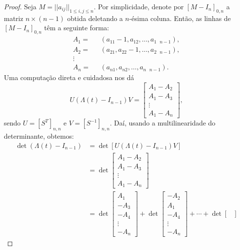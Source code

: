 	\begin{proof}
		Seja $M = ||a_{ij}||_{1\leq i,j\leq n}$. Por simplicidade, denote por $[M - I_n]_{0,n}$ 
		a matriz $n\times(n-1)$ obtida deletando a $n$-ésima coluna. Então, as linhas de 
		$[M - I_n]_{0,n}$ têm a seguinte forma:
		\begin{align*}
    		A_1 =& \text{ }(a_{11} - 1, a_{12}, \dots, a_{1\text{ }n-1}), \\
    		A_2 =& \text{ }(a_{21}, a_{22} - 1, \dots, a_{2\text{ }n-1}), \\
    		\vdots& \\
    		A_n =& \text{ }(a_{n1}, a_{n2}, \dots, a_{n\text{ }n-1}).
		\end{align*}
		Uma computação direta e cuidadosa nos dá
		\begin{equation*}
    		U(\Lambda(t) - I_{n-1})V = \begin{bmatrix}
    		A_1 - A_2 \\
    		A_1 - A_3 \\
    		\vdots \\
    		A_1 - A_n
    		\end{bmatrix},
		\end{equation*}
		sendo $U = [S^T]_{n,n}$ e $V = [S^{-1}]_{n,n}$. Daí, usando a multilinearidade 
		do determinante, obtemos:
		\begin{align*}
    		\det(\Lambda(t) - I_{n-1}) 
    		&=\det[U(\Lambda(t) - I_{n-1})V] 
    		\\
    		&= \det\begin{bmatrix}
    		A_1 - A_2\\
    		A_1 - A_3 \\
    		\vdots \\
    		A_1 - A_n
    		\end{bmatrix}
    		\\
    		&= \det\begin{bmatrix}
    		A_1 \\
    		-A_3 \\
    		-A_4 \\
    		\vdots \\
    		-A_n
    		\end{bmatrix} + \det\begin{bmatrix}
    		-A_2 \\
    		A_1 \\
    		-A_4 \\
    		\vdots\\
    		-A_n
    		\end{bmatrix} +\cdots + \det\begin{bmatrix}

\end{bmatrix}
\end{align*}
\end{proof}
